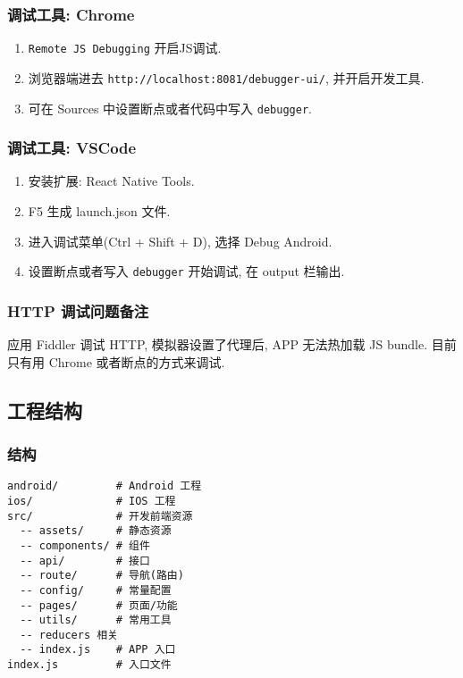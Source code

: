 \subsubsection{调试工具: Chrome}\label{ux8c03ux8bd5ux5de5ux5177-chrome}

\begin{enumerate}
\def\labelenumi{\arabic{enumi}.}
\tightlist
\item
  \lstinline!Remote JS Debugging! 开启JS调试.
\item
  浏览器端进去 \lstinline!http://localhost:8081/debugger-ui/!,
  并开启开发工具.
\item
  可在 Sources 中设置断点或者代码中写入 \lstinline!debugger!.
\end{enumerate}

\subsubsection{调试工具: VSCode}\label{ux8c03ux8bd5ux5de5ux5177-vscode}

\begin{enumerate}
\def\labelenumi{\arabic{enumi}.}
\tightlist
\item
  安装扩展: React Native Tools.
\item
  F5 生成 launch.json 文件.
\item
  进入调试菜单(Ctrl + Shift + D), 选择 Debug Android.
\item
  设置断点或者写入 \lstinline!debugger! 开始调试, 在 output 栏输出.
\end{enumerate}

\subsubsection{HTTP
调试问题备注}\label{http-ux8c03ux8bd5ux95eeux9898ux5907ux6ce8}

应用 Fiddler 调试 HTTP, 模拟器设置了代理后, APP 无法热加载 JS bundle.
目前只有用 Chrome 或者断点的方式来调试.

\subsection{工程结构}\label{ux5de5ux7a0bux7ed3ux6784}

\subsubsection{结构}\label{ux7ed3ux6784}

\begin{lstlisting}
android/         # Android 工程
ios/             # IOS 工程
src/             # 开发前端资源
  -- assets/     # 静态资源
  -- components/ # 组件
  -- api/        # 接口
  -- route/      # 导航(路由)
  -- config/     # 常量配置
  -- pages/      # 页面/功能
  -- utils/      # 常用工具
  -- reducers 相关
  -- index.js    # APP 入口
index.js         # 入口文件
\end{lstlisting}

